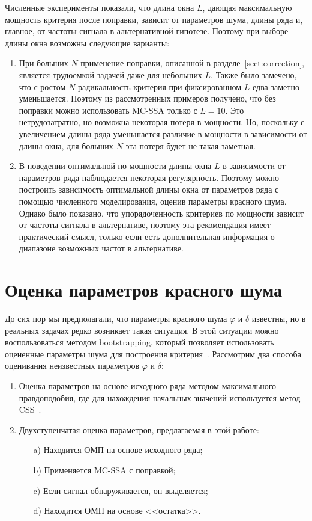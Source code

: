 \documentclass[specialist,
substylefile = spbu_report.rtx,
subf,href,colorlinks=true, 12pt]{disser}
\theoremstyle{definition}
\begin{document}
Численные эксперименты показали, что длина окна $L$, дающая максимальную мощность критерия после поправки, зависит от параметров шума, длины ряда и, главное, от частоты сигнала в альтернативной гипотезе. Поэтому при выборе длины окна возможны следующие варианты:
\begin{enumerate}
	\item При больших $N$ применение поправки, описанной в разделе~\ref{sect:correction}, является трудоемкой задачей даже для небольших $L$. Также было замечено, что с ростом $N$ радикальность критерия при фиксированном $L$ едва заметно уменьшается. Поэтому из рассмотренных примеров получено, что без поправки можно использовать MC-SSA только с $L=10$. Это нетрудозатратно, но возможна некоторая потеря в мощности. Но, поскольку с увеличением длины ряда уменьшается различие в мощности в зависимости от длины окна, для больших $N$ эта потеря будет не такая заметная.
	\item В поведении оптимальной по мощности длины окна $L$ в зависимости от параметров ряда наблюдается некоторая регулярность. Поэтому можно построить зависимость оптимальной длины окна от параметров ряда с помощью численного моделирования, оценив параметры красного шума. Однако было показано, что упорядоченность критериев по мощности зависит от частоты сигнала в альтернативе, поэтому эта рекомендация имеет практический смысл, только если есть дополнительная информация о диапазоне возможных частот в альтернативе.
\end{enumerate}

\section{Оценка параметров красного шума}\label{sect:phi_est}
До сих пор мы предполагали, что параметры красного шума $\varphi$ и $\delta$ известны, но в реальных задачах редко возникает такая ситуация. В этой ситуации можно воспользоваться методом bootstrapping, который позволяет использовать оцененные параметры шума для построения критерия~\cite{Golyandina_2023}. Рассмотрим два способа оценивания неизвестных параметров $\varphi$ и $\delta$:
\begin{enumerate}
	\item Оценка параметров на основе исходного ряда методом максимального правдоподобия, где для нахождения начальных значений используется метод CSS~\cite{ARIMA_est}.
	\item Двухступенчатая оценка параметров, предлагаемая в этой работе:
	\begin{enumerate}
		\item[a)] Находится ОМП на основе исходного ряда;
		\item[b)] Применяется MC-SSA с поправкой;
		\item[c)] Если сигнал обнаруживается, он выделяется;
		\item[d)] Находится ОМП на основе <<остатка>>.
	\end{enumerate}
\end{enumerate}
\end{document}
